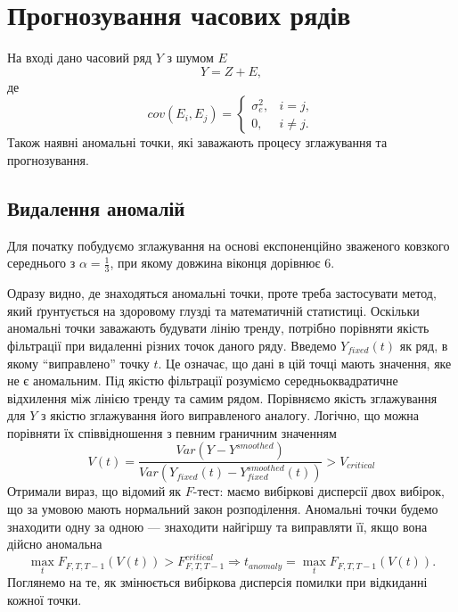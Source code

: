 \chapter{Прогнозування часових рядів}

На вході дано часовий ряд $Y$ з шумом $E$
\begin{equation*}
  Y = Z + E,
\end{equation*}
де
\begin{equation*}
  cov(E_i, E_j) =
    \begin{cases}
      \sigma_e^2,& i = j, \\
      0,&          i \neq j.
    \end{cases}
\end{equation*}
Також наявні аномальні точки,
які заважають процесу зглажування та прогнозування.

\section{Видалення аномалій}

Для початку побудуємо зглажування на основі експоненційно зваженого
ковзкого середнього з $\alpha = \frac{1}{3}$,
при якому довжина віконця дорівнює $6$.
\begin{center}
\end{center}

Одразу видно, де знаходяться аномальні точки,
проте треба застосувати метод,
який ґрунтується на здоровому глузді
та математичній статистиці.
Оскільки аномальні точки заважають будувати лінію тренду,
потрібно порівняти якість фільтрації при видаленні різних точок даного ряду.
Введемо $Y_{fixed}\left( t \right)$ як ряд, в якому ``виправлено'' точку $t$.
Це означає, що дані в цій точці мають значення, яке не є аномальним.
Під якістю фільтрації розуміємо середньоквадратичне відхилення
між лінією тренду та самим рядом.
Порівняємо якість зглажування для $Y$
з якістю зглажування його виправленого аналогу.
Логічно, що можна порівняти їх співвідношення з певним граничним значенням
\begin{equation*}
  V\left( t \right)
  = \frac{Var\left( Y - Y^{smoothed} \right)}
         {Var\left( Y_{fixed}\left(t\right)
                    - Y_{fixed}^{smoothed}\left(t\right) \right)}
  > V_{critical}
\end{equation*}
Отримали вираз, що відомий як $F$-тест:
маємо вибіркові дисперсії двох вибірок,
що за умовою мають нормальний закон розподілення.
Аномальні точки будемо знаходити одну за одною ---
знаходити найгіршу та виправляти її,
якщо вона дійсно аномальна
\begin{equation*}
  \max\limits_{t}{F_{F, T, T-1}\left( V\left( t \right) \right)}
    > F_{F, T, T-1}^{critical}
  \Longrightarrow
  t_{anomaly} = \max\limits_{t}{F_{F, T, T-1}\left( V\left( t \right) \right)}.
\end{equation*}
Поглянемо на те, як змінюється вибіркова дисперсія помилки
при відкиданні кожної точки.
\begin{center}
\end{center}

